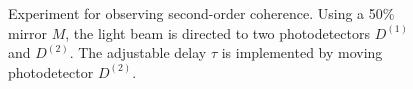 \begin{figure}
\centering



\caption{Experiment for observing second-order coherence. Using a 50\% mirror $M$, the light beam is directed to two photodetectors $D^{(1)}$ and $D^{(2)}$. The adjustable delay $\tau$ is implemented by moving photodetector $D^{(2)}$.}
\label{figPart4Ch2_4}
\end{figure}